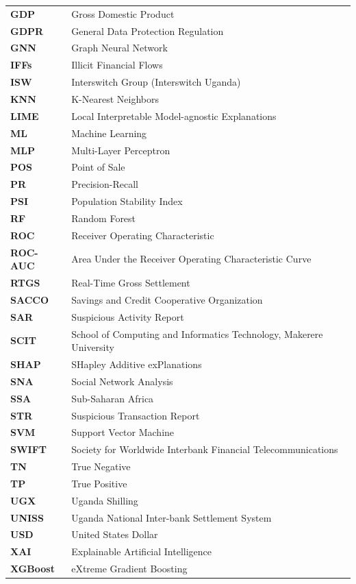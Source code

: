 \begin{longtable}{@{}p{3.2cm}p{12.8cm}@{}}
\textbf{GDP} & Gross Domestic Product \\
\textbf{GDPR} & General Data Protection Regulation \\
\textbf{GNN} & Graph Neural Network \\
\textbf{IFFs} & Illicit Financial Flows \\
\textbf{ISW} & Interswitch Group (Interswitch Uganda) \\
\textbf{KNN} & K-Nearest Neighbors \\
\textbf{LIME} & Local Interpretable Model-agnostic Explanations \\
\textbf{ML} & Machine Learning \\
\textbf{MLP} & Multi-Layer Perceptron \\
\textbf{POS} & Point of Sale \\
\textbf{PR} & Precision-Recall \\
\textbf{PSI} & Population Stability Index \\
\textbf{RF} & Random Forest \\
\textbf{ROC} & Receiver Operating Characteristic \\
\textbf{ROC-AUC} & Area Under the Receiver Operating Characteristic Curve \\
\textbf{RTGS} & Real-Time Gross Settlement \\
\textbf{SACCO} & Savings and Credit Cooperative Organization \\
\textbf{SAR} & Suspicious Activity Report \\
\textbf{SCIT} & School of Computing and Informatics Technology, Makerere University \\
\textbf{SHAP} & SHapley Additive exPlanations \\
\textbf{SNA} & Social Network Analysis \\
\textbf{SSA} & Sub-Saharan Africa \\
\textbf{STR} & Suspicious Transaction Report \\
\textbf{SVM} & Support Vector Machine \\
\textbf{SWIFT} & Society for Worldwide Interbank Financial Telecommunications \\
\textbf{TN} & True Negative \\
\textbf{TP} & True Positive \\
\textbf{UGX} & Uganda Shilling \\
\textbf{UNISS} & Uganda National Inter-bank Settlement System \\
\textbf{USD} & United States Dollar \\
\textbf{XAI} & Explainable Artificial Intelligence \\
\textbf{XGBoost} & eXtreme Gradient Boosting \\
\end{longtable}
